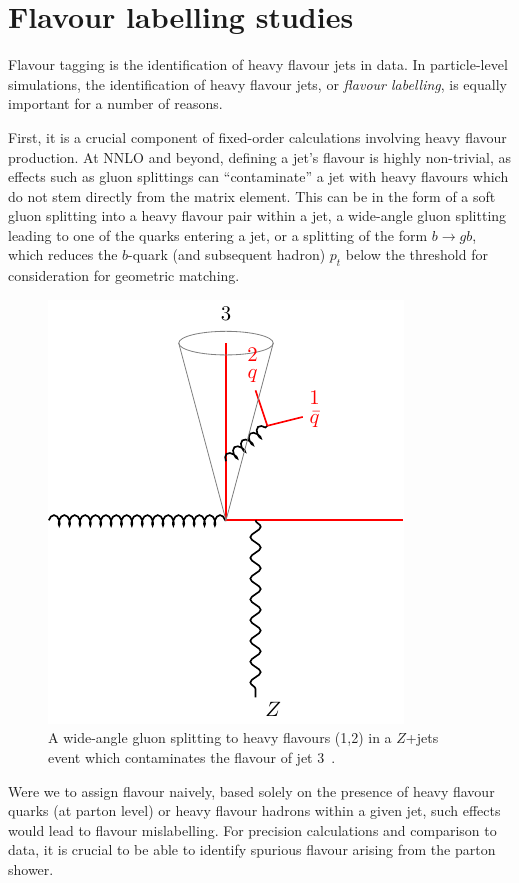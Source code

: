 \documentclass[10pt,a4paper]{book}
\begin{document}
\chapter{Flavour labelling studies}

Flavour tagging is the identification of heavy flavour jets in data. In particle-level simulations, the identification of heavy flavour jets, or \emph{flavour labelling}, is equally important for a number of reasons. 

First, it is a crucial component of fixed-order calculations involving heavy flavour production. At NNLO and beyond, defining a jet's flavour is highly non-trivial, as effects such as gluon splittings can ``contaminate'' a jet with heavy flavours which do not stem directly from the matrix element. This can be in the form of a soft gluon splitting into a heavy flavour pair within a jet, a wide-angle gluon splitting leading to one of the quarks entering a jet, or a splitting of the form $b\rightarrow gb$, which reduces the $b$-quark (and subsequent hadron) $p_t$ below the threshold for consideration for geometric matching.

\begin{figure}
    \centering
    \includegraphics[width=0.5\linewidth]{ftag/NNLO-standard-issue.pdf}
    \caption{A wide-angle gluon splitting to heavy flavours (1,2) in a $Z$+jets event which contaminates the flavour of jet 3~\cite{Caola:2023wpj}.}
    \label{fig:nnlo}
\end{figure}

Were we to assign flavour naively, based solely on the presence of heavy flavour quarks (at parton level) or heavy flavour hadrons within a given jet, such effects would lead to flavour mislabelling. For precision calculations and comparison to data, it is crucial to be able to identify spurious flavour arising from the parton shower.
\end{document}
